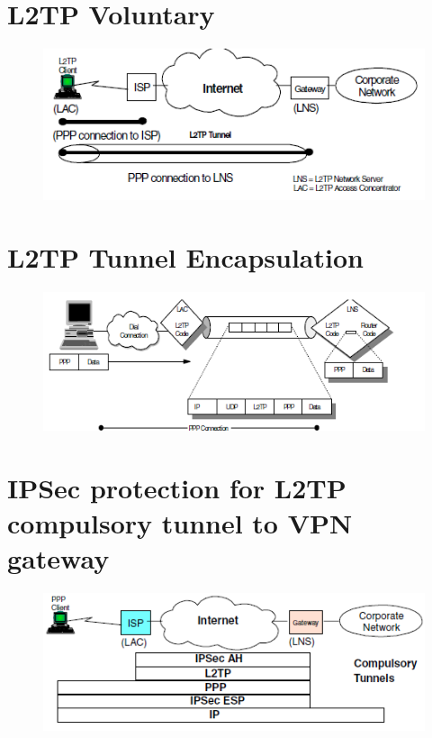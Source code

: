 \documentclass[10pt,a4paper]{article}
\begin{document}
\begin{itemize}
\begin{itemize}
\begin{itemize}
\newpage
\section{L2TP Voluntary}

\begin{figure}[hbtp]
\centering
\includegraphics[scale=1]{L2TPVoluntary.png}
\end{figure}

\newpage
\section{L2TP Tunnel Encapsulation}

\begin{figure}[hbtp]
\centering
\includegraphics[scale=1]{L2TP Tunnel Encapsulation.png}
\end{figure}
\newpage
\section{IPSec protection for L2TP compulsory tunnel to VPN gateway}

\begin{figure}[hbtp]
\centering
\includegraphics[scale=1]{IPSec protection for L2TP compulsory tunnel to VPN gateway.png}
\end{figure}


\end{itemize}
\end{itemize}
\end{itemize}
\end{document}
